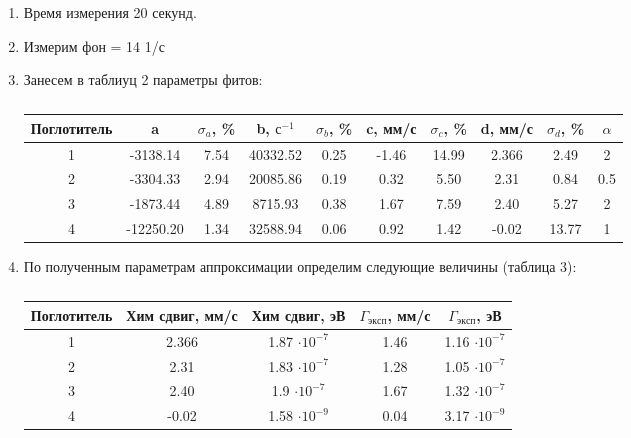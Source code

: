 \documentclass[a4paper]{article}
\begin{document}
\begin{enumerate}
    \item Время измерения 20 секунд.
    \item Измерим фон = 14 1/с
    \item Занесем в таблиуц 2 параметры фитов:
    
    \begin{table}[H]
        \centering
        \caption{}
        \label{t2}
        \vspace{0.1cm}
        \begin{tabular}{|c|c|c|c|c|c|c|c|c|c|}
    \hline
    Поглотитель & a& $\sigma_a$, \% &b, $с^{-1}$& $\sigma_b$, \% & c, мм/с & $\sigma_c$, \% & d, мм/с & $\sigma_d$, \% & $\alpha$ \\ \hline
    1 &-3138.14 & 7.54 & 40332.52 & 0.25 & -1.46 & 14.99 & 2.366 & 2.49 & 2 \\ \hline
    2 & -3304.33 &2.94 &20085.86 & 0.19 & 0.32 & 5.50 &2.31 & 0.84&0.5 \\ \hline
    3 & -1873.44& 4.89& 8715.93& 0.38 & 1.67&7.59 &2.40 &5.27 & 2\\ \hline
    4 &-12250.20 & 1.34& 32588.94& 0.06 & 0.92& 1.42&-0.02 & 13.77&1 \\   \hline
    \end{tabular}
    \end{table}


    \item По полученным параметрам аппроксимации определим следующие величины (таблица 3):
    
    \begin{table}[H]
        \centering
        \caption{}
        \label{t3}
        \vspace{0.1cm}
        \begin{tabular}{|c|c|c|c|c|}
    \hline
    Поглотитель & Хим сдвиг, мм/с& Хим сдвиг, эВ& $\Gamma_{эксп}$, мм/с & $\Gamma_{эксп}$, эВ \\ \hline
    1 & 2.366 & 1.87 $\cdot 10^{-7}$& 1.46 & 1.16 $\cdot 10^{-7}$\\ \hline
    2 & 2.31&  1.83 $\cdot 10^{-7}$ & 1.28& 1.05 $\cdot 10^{-7}$ \\ \hline
    3 & 2.40& 1.9 $\cdot 10^{-7}$&1.67 & 1.32 $\cdot 10^{-7}$ \\ \hline
    4 & -0.02&  1.58 $\cdot 10^{-9}$&0.04& 3.17 $\cdot 10^{-9}$\\   \hline
    \end{tabular}
    \end{table}


\end{enumerate}
\end{document}
